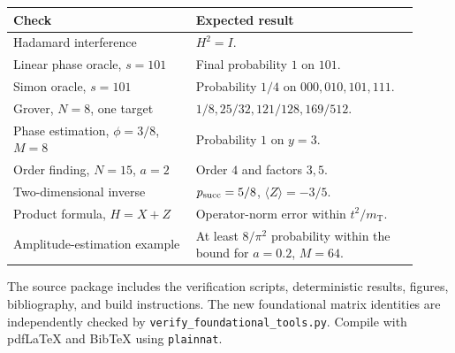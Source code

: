 \documentclass[11pt,a4paper]{article}
\newcommand{\nT}{m_{\mathrm{T}}}
\theoremstyle{definition}
\theoremstyle{remark}
\numberwithin{equation}{section}
\begin{document}
\begin{center}
\small
\begin{tabular}{p{0.41\linewidth}p{0.50\linewidth}}
\toprule
Check & Expected result\\
\midrule
Hadamard interference & $H^2=I$.\\
Linear phase oracle, $s=101$ & Final probability $1$ on $101$.\\
Simon oracle, $s=101$ & Probability $1/4$ on $000,010,101,111$.\\
Grover, $N=8$, one target & $1/8,25/32,121/128,169/512$.\\
Phase estimation, $\phi=3/8$, $M=8$ & Probability $1$ on $y=3$.\\
Order finding, $N=15$, $a=2$ & Order $4$ and factors $3,5$.\\
Two-dimensional inverse & $p_{\rm succ}=5/8$, $\langle Z\rangle=-3/5$.\\
Product formula, $H=X+Z$ & Operator-norm error within $t^2/\nT$.\\
Amplitude-estimation example & At least $8/\pi^2$ probability within
the bound for $a=0.2$, $M=64$.\\
\bottomrule
\end{tabular}
\end{center}

The source package includes the verification scripts, deterministic results,
figures, bibliography, and build instructions. The new foundational matrix
identities are independently checked by \texttt{verify\_foundational\_tools.py}.
Compile with pdfLaTeX and BibTeX using \texttt{plainnat}.
\end{document}
